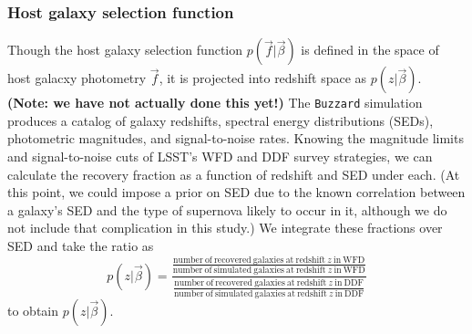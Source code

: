 \documentclass[12pt, onecolumn]{emulateapj}
\newcommand{\textul}{\underline}
\newcommand{\scippr}{\texttt{scippr}}
\begin{document}
\subsubsection{Host galaxy selection function}
\label{sec:hostselection}

Though the host galaxy selection function $p(\vec{f} | \vec{\beta})$ is defined in the space of host galacxy photometry $\vec{f}$, it is projected into redshift space as $p(z | \vec{\beta})$.  \textbf{(Note: we have not actually done this yet!)}  The \texttt{Buzzard} simulation produces a catalog of galaxy redshifts, spectral energy distributions (SEDs), photometric magnitudes, and signal-to-noise rates.  Knowing the magnitude limits and signal-to-noise cuts of LSST's WFD and DDF survey strategies, we can calculate the recovery fraction as a function of redshift and SED under each.  (At this point, we could impose a prior on SED due to the known correlation between a galaxy's SED and the type of supernova likely to occur in it, although we do not include that complication in this study.)  We integrate these fractions over SED and take the ratio as
\begin{equation}
    \label{eq:hostselfunwords}
    p(z | \vec{\beta}) = \frac{\frac{\mathrm{number\ of\ recovered\ galaxies\ at\ redshift\ }z\mathrm{\ in\ WFD}}{\mathrm{number\ of\ simulated\ galaxies\ at\ redshift\ }z\mathrm{\ in\ WFD}}}{\frac{\mathrm{number\ of\ recovered\ galaxies\ at\ redshift\ }z\mathrm{\ in\ DDF}}{\mathrm{number\ of\ simulated\ galaxies\ at\ redshift\ }z\mathrm{\ in\ DDF}}}
\end{equation}
to obtain $p(z | \vec{\beta})$.


\end{document}
